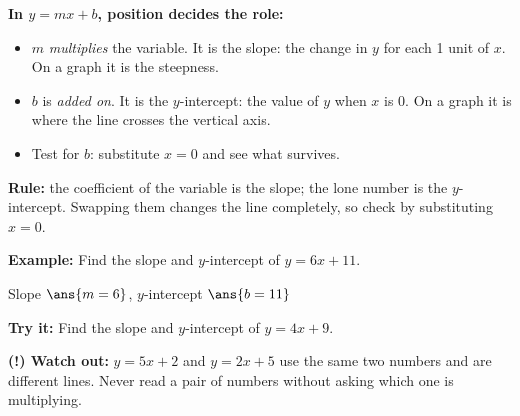 \documentclass[12pt]{article}
\begin{document}

\begin{formulabox}
\textbf{In $y = mx + b$, position decides the role:}\par
\begin{itemize}[leftmargin=0.9cm, itemsep=1pt, topsep=2pt]
  \item $m$ \emph{multiplies} the variable. It is the slope: the change in $y$
        for each 1 unit of $x$. On a graph it is the steepness.
  \item $b$ is \emph{added on}. It is the $y$-intercept: the value of $y$ when
        $x$ is 0. On a graph it is where the line crosses the vertical axis.
  \item Test for $b$: substitute $x = 0$ and see what survives.
\end{itemize}
\end{formulabox}


\begin{formulabox}
\textbf{Rule:} the coefficient of the variable is the slope; the lone number
is the $y$-intercept. Swapping them changes the line completely, so check by
substituting $x = 0$.
\end{formulabox}

\begin{examplebox}
\textbf{Example:} \quad Find the slope and $y$-intercept of $y = 6x + 11$.

Slope $\ans{m = 6}$, \quad $y$-intercept $\ans{b = 11}$
\end{examplebox}

\begin{tryitbox}
\textbf{Try it:} \quad Find the slope and $y$-intercept of $y = 4x + 9$.\\[2pt]
\end{tryitbox}

\begin{watchoutbox}
\textbf{(!) Watch out:} $y = 5x + 2$ and $y = 2x + 5$ use the same two
numbers and are different lines. Never read a pair of numbers without asking
which one is multiplying.
\end{watchoutbox}
\end{document}
